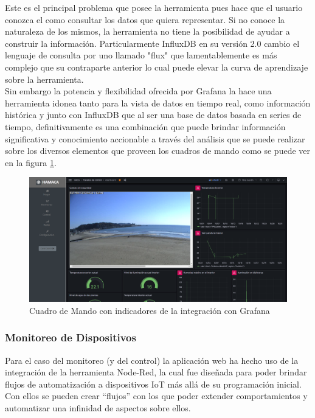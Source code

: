 Este es el principal problema que posee la herramienta pues hace que el usuario conozca el como consultar  los datos que quiera representar. Si no conoce la naturaleza de los mismos, la herramienta no tiene la posibilidad de ayudar a construir la información. Particularmente InfluxDB en su versión 2.0 cambio el lenguaje de consulta por uno llamado "flux" que lamentablemente es más complejo que su contraparte anterior lo cual puede elevar la curva de aprendizaje sobre la herramienta.\\

Sin embargo la potencia y flexibilidad ofrecida por Grafana la hace una herramienta idonea tanto para la vista de datos en tiempo real, como información histórica y junto con InfluxDB que al ser una base de datos basada en series de tiempo, definitivamente es una combinación que puede brindar información significativa y conocimiento accionable a través del análisis que se puede realizar sobre los diversos elementos que proveen los cuadros de mando como se puede ver en la figura \ref{fig:hamaca_grafana_panel}.  
\begin{figure}[htb]
\centering
\includegraphics[scale=0.23]{./Figuras/hamaca_grafana_panel.png}
\caption{Cuadro de Mando con indicadores de la integración con Grafana}
\label{fig:hamaca_grafana_panel}
\vspace*{-10pt}
\end{figure}

\subsubsection{Monitoreo de Dispositivos}
Para el caso del monitoreo (y del control) la aplicación web ha hecho uso de la integración de la herramienta Node-Red, la cual fue diseñada para poder brindar flujos de automatización a dispositivos IoT más allá de su programación inicial. Con ellos se pueden crear ``flujos'' con los que poder extender comportamientos y automatizar una infinidad de aspectos sobre ellos. 

